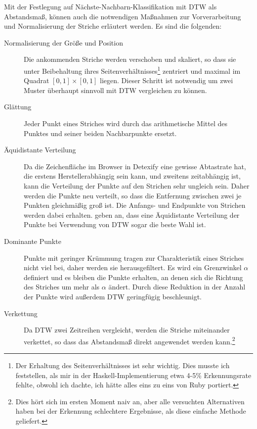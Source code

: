 Mit der Festlegung auf Nächste-Nachbarn-Klassifikation mit DTW als Abstandsmaß, können auch die notwendigen Maßnahmen zur Vorverarbeitung und Normalisierung der Striche erläutert werden. Es sind die folgenden:

\begin{description}
  \item[Normalisierung der Größe und Position]
  Die ankommenden Striche werden verschoben und skaliert, so dass sie unter Beibehaltung ihres Seitenverhältnisses\footnote{Der Erhaltung des Seitenverhältnisses ist sehr wichtig. Dies musste ich feststellen, als mir in der Haskell-Implementierung etwa 4-5\% Erkennungsrate fehlte, obwohl ich dachte, ich hätte alles eins zu eins von Ruby portiert.} zentriert und maximal im Quadrat \([0,1]\times[0,1]\) liegen. Dieser Schritt ist notwendig um zwei Muster überhaupt sinnvoll mit DTW vergleichen zu können.
  \item[Glättung]
  Jeder Punkt eines Striches wird durch das arithmetische Mittel des Punktes und seiner beiden Nachbarpunkte ersetzt.
  \item[Äquidistante Verteilung] Da die Zeichenfläche im Browser in Detexify eine gewisse Abtastrate hat, die erstens Herstellerabhängig sein kann, und zweitens zeitabhängig ist, kann die Verteilung der Punkte auf den Strichen sehr ungleich sein. Daher werden die Punkte neu verteilt, so dass die Entfernung zwischen zwei je Punkten gleichmäßig groß ist. Die Anfangs- und Endpunkte von Strichen werden dabei erhalten. \citet{Golubitsky:2009p1842} geben an, dass eine Äquidistante Verteilung der Punkte bei Verwendung von DTW sogar die beste Wahl ist.
  \item[Dominante Punkte] Punkte mit geringer Krümmung tragen zur Charakteristik eines Striches nicht viel bei, daher werden sie herausgefiltert. Es wird ein Grenzwinkel $\alpha$ definiert und es bleiben die Punkte erhalten, an denen sich die Richtung des Striches um mehr als $\alpha$ ändert. Durch diese Reduktion in der Anzahl der Punkte wird außerdem DTW geringfügig beschleunigt.
  \item[Verkettung] Da \ac{DTW} zwei Zeitreihen vergleicht, werden die Striche miteinander verkettet, so dass das Abstandsmaß direkt angewendet werden kann.\footnote{Dies hört sich im ersten Moment naiv an, aber alle versuchten Alternativen haben bei der Erkennung schlechtere Ergebnisse, als diese einfache Methode geliefert.}
\end{description}



